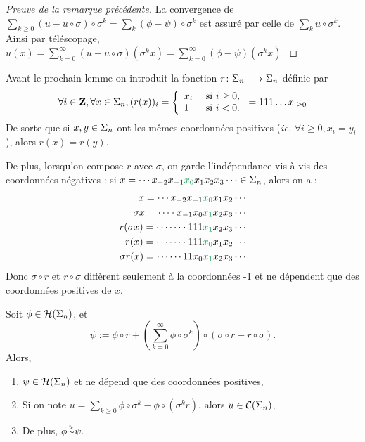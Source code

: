   \begin{proof}[Preuve de la remarque précédente]
    La convergence de $\sum_{k \geq 0}{(u - u\circ\sigma)\circ\sigma^k} = \sum_k{(\phi - \psi)\circ\sigma^k}$ est assuré
    par celle de $\sum_k{u\circ\sigma^k}$.
    Ainsi par téléscopage,
    $u(x) = \sum_{k=0}^{\infty}{(u - u \circ \sigma)(\sigma^k x)} = \sum_{k=0}^{\infty}{(\phi - \psi)(\sigma^k x)}$.
  \end{proof}

  Avant le prochain lemme on introduit la fonction $r \colon \Sigma_n \longrightarrow \Sigma_n$ définie par
  $$\forall i \in \mathbf Z, \forall x \in \Sigma_n, (r(x))_i = \left\{
    \begin{array}{ll}
      x_i &\text{ si } i \geq 0, \\
      1   &\text{ si } i < 0.
    \end{array} \right. = 111\hdots x_{|\geq 0}$$
    De sorte que si $x, y \in \Sigma_n$ ont les mêmes coordonnées positives (\textit{ie.} $\forall i \geq 0, x_i = y_i$), alors $r(x) = r(y)$.

    De plus, lorsqu'on compose $r$ avec $\sigma$, on garde l'indépendance vis-à-vis des coordonnées négatives :
    si $x = \cdots x_{-2}x_{-1}\textcolor{ForestGreen}{x_0} x_1 x_2 x_3\cdots \in \s_n$, alors on a :
    \begin{align*}
        x           = \cdots x_{-2}x_{-1}   &\textcolor{ForestGreen}{x_0} x_1 x_2\cdots \\
	\sigma x    = \cdots\cdot x_{-1}x_0 &\textcolor{ForestGreen}{x_1}x_2 x_3\cdots \\
	r(\sigma x) = \cdots\cdots\cdot 111 &\textcolor{ForestGreen}{x_1}x_2x_3\cdots \\
	r(x)	    = \cdots\cdots\cdot 111 &\textcolor{ForestGreen}{x_0}x_1 x_2\cdots \\
	\sigma r(x) = \cdots\cdots 11x_0    &\textcolor{ForestGreen}{x_1}x_2 x_3\cdots
    \end{align*}
    Donc $\sigma \circ r$ et $r \circ \sigma$ diffèrent seulement à la coordonnées -1 et ne dépendent que des coordonnées positives de $x$.

  \begin{lemma}
    \label{lem:fn_equiv_pos_coords}
    Soit $\phi \in \mathcal{H} (\Sigma_{n})$, et
    $$\psi := \phi \circ r + \left(\sum_{k=0}^{\infty}{\phi \circ \sigma^k}\right)\circ(\sigma \circ r - r \circ \sigma).$$
    Alors,
    \begin{enumerate}
      \item $\psi \in \mathcal{H} (\Sigma_{n})$ et ne dépend que des coordonnées positives,
      \item Si on note $u = \sum_{k\geq 0}{\phi\circ\sigma^k - \phi\circ(\sigma^k r)}$, alors $u \in \mathcal{C} (\Sigma_{n})$,
      \item De plus, $\phi \overset{u}{\sim} \psi$.
    \end{enumerate}
  \end{lemma}

